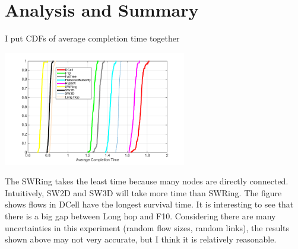 \documentclass[11pt]{article}
\begin{document}
\section{Analysis and Summary}
I put CDFs of average completion time together\\
\centerline{\includegraphics[width=0.6\textwidth]{figure/picture/All_new.png}}
The SWRing takes the least time because many nodes are directly connected. Intuitively, SW2D and SW3D will take more time than SWRing. The figure shows flows in DCell have the longest survival time. It is interesting to see that there is a big gap between Long hop and F10. Considering there are many uncertainties in this experiment (random flow sizes, random links), the results shown above may not very accurate, but I think it is relatively reasonable. 
\end{document}
